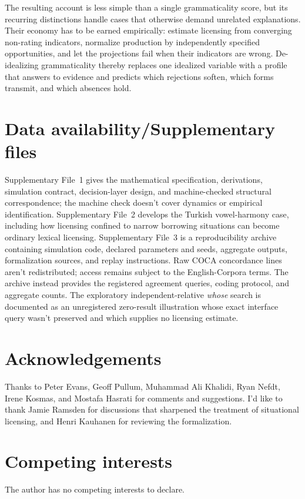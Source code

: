 \documentclass[12pt,letterpaper]{article}
\newif\ifanonymous
\newcommand{\mention}[1]{\textit{#1}}
\begin{document}
The resulting account is less simple than a single grammaticality score, but
its recurring distinctions handle cases that otherwise demand unrelated
explanations. Their
economy has to be earned empirically: estimate licensing from converging
non-rating indicators, normalize production by independently specified
opportunities, and let the projections fail when their indicators are wrong.
De-idealizing grammaticality thereby replaces one idealized variable with a
profile that answers to evidence and predicts which rejections soften, which
forms transmit, and which absences hold.

\section*{Data availability/Supplementary files}
Supplementary File~1 gives the mathematical specification, derivations,
simulation contract, decision-layer design, and machine-checked structural
correspondence; the machine check doesn't cover dynamics or empirical
identification. Supplementary File~2 develops the Turkish vowel-harmony case,
including how licensing confined to narrow borrowing situations can become
ordinary lexical licensing. Supplementary File~3 is a reproducibility archive containing
simulation code, declared parameters and seeds, aggregate outputs, formalization
sources, and replay instructions. Raw COCA concordance lines aren't
redistributed; access remains subject to the English-Corpora terms. The archive
instead provides the registered agreement queries, coding protocol, and
aggregate counts. The exploratory independent-relative \mention{whose} search
is documented as an unregistered zero-result illustration whose exact interface
query wasn't preserved and which supplies no licensing estimate.


\ifanonymous\else
  \section*{Acknowledgements}
  Thanks to Peter Evans, Geoff Pullum, Muhammad Ali Khalidi, Ryan Nefdt, Irene
  Kosmas, and Mostafa Hasrati for comments and suggestions. I'd like to thank
  Jamie Ramsden for discussions that sharpened the treatment of situational
  licensing, and Henri Kauhanen for reviewing the formalization.
\fi

\section*{Competing interests}
The author has no competing interests to declare.
\end{document}
